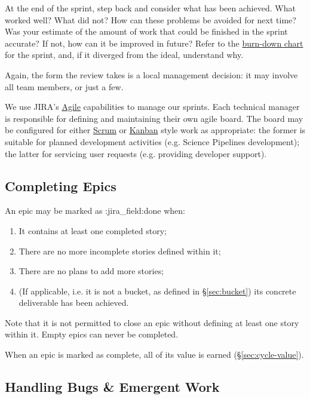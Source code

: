 \begin{enumerate}
  At the end of the sprint, step back and consider what has been
  achieved. What worked well? What did not? How can these problems be
  avoided for next time? Was your estimate of the amount of work that
  could be finished in the sprint accurate? If not, how can it be
  improved in future? Refer to the
  \href{https://en.wikipedia.org/wiki/Burn_down_chart}{burn-down chart}
  for the sprint, and, if it diverged from the ideal, understand why.

  Again, the form the review takes is a local management decision: it
  may involve all team members, or just a few.
\end{enumerate}

We use JIRA's
\href{https://www.atlassian.com/software/jira/agile}{Agile} capabilities
to manage our sprints. Each technical manager is responsible for
defining and maintaining their own agile board. The board may be
configured for either
\href{https://en.wikipedia.org/wiki/Scrum_(software_development)}{Scrum}
or \href{https://en.wikipedia.org/wiki/Kanban_(development)}{Kanban}
style work as appropriate: the former is suitable for planned
development activities (e.g. Science Pipelines development); the latter
for servicing user requests (e.g. providing developer support).

\subsection{Completing Epics}
\label{sec:epic-done}

An epic may be marked as :jira\_field:done when:

\begin{enumerate}
\item
  It contains at least one completed story;
\item
  There are no more incomplete stories defined within it;
\item
  There are no plans to add more stories;
\item
  (If applicable, i.e. it is not a bucket, as defined in \S\ref{sec:bucket}) its concrete deliverable has been achieved.
\end{enumerate}

Note that it is not permitted to close an epic without defining at least
one story within it. Empty epics can never be completed.

When an epic is marked as complete, all of its value is earned (\S\ref{sec:cycle-value}).

\subsection{Handling Bugs \& Emergent Work}
\label{sec:bugs}

